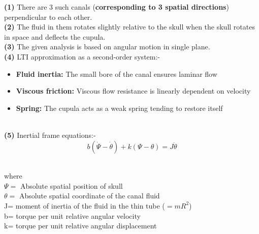\documentclass[15.7pt]{article}
\renewcommand\part[1]{\vspace{.10in}\textbf{(#1)}}
\begin{document}
\part{1} There are 3 such canals (\textbf{corresponding to 3 spatial directions}) perpendicular to each other.
\\ \part{2} The fluid in them rotates slightly relative to the skull when the skull rotates in space and deflects the cupula.
\\ \part{3} The given analysis is based on angular motion in single plane.
\\ \part{4} LTI approximation as a second-order system:-
     \begin{itemize}
         \item \textbf{Fluid inertia:} The small bore of the canal ensures laminar flow
         \item \textbf{Viscous friction:} Viscous flow resistance is linearly dependent on velocity
         \item \textbf{Spring:} The cupula acts as a weak spring tending to restore itself
     \end{itemize}
\\ \part{5} Inertial frame equations:-
\begin{equation}
    b(\dot \Psi - \dot \theta) + k(\Psi - \theta) = J\ddot \theta 
\end{equation}
\begin{flushleft}
    \\where 
    \smallskip
    \\$\Psi=$ Absolute spatial position of skull
    \\ $\theta=$ Absolute spatial coordinate of the canal fluid
    \\J= moment of inertia of the fluid in the thin tube ($=mR^{2}$)
    \\b= torque per unit relative angular velocity 
    \\k= torque per unit relative angular displacement
    \end{flushleft}
\end{document}
